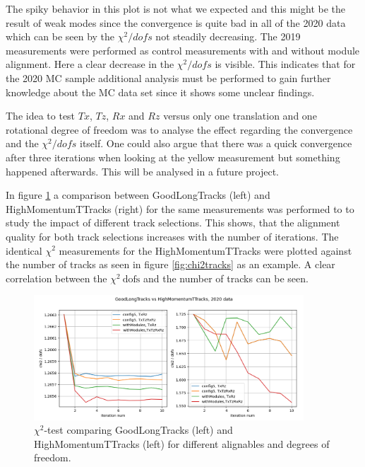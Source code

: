 The spiky behavior in this plot is not what we expected and this might be the result of weak modes since the convergence is quite bad in all of the 2020 data which can be seen by the $\chi^2 / dofs$ not steadily decreasing.
The 2019 measurements were performed as control measurements with and without
module alignment. Here a clear decrease in the $\chi^2 / dofs$ is visible. This
indicates that for the 2020 MC sample additional analysis must be performed to gain further knowledge about the MC data set since it shows some unclear findings.

The idea to test $Tx$, $Tz$, $Rx$ and $Rz$ versus only one translation and one
rotational degree of freedom was to analyse the effect regarding the convergence and the $\chi^2 / dofs$ itself. One could also argue that there was a quick convergence after three iterations when looking at the yellow measurement but something happened afterwards. This will be analysed in a future project.

In figure \ref{fig:chi2iter} a comparison between GoodLongTracks (left) and HighMomentumTTracks (right) for the same measurements was performed to to study the impact of different track selections. This shows, that the alignment quality for both track selections increases with the number of iterations.
The identical $\chi^2$ measurements for the HighMomentumTTracks were plotted against the number of tracks as seen in figure \ref{fig:chi2tracks} as an example.
A clear correlation between the $\chi^2 \ \text{dofs}$ and the number of tracks can be seen.

\begin{figure}
  \centering
  \includegraphics[width=0.9\textwidth]{plots/GL_HM_chi2_2020.png}
  \caption{$\chi^2$-test comparing GoodLongTracks (left) and HighMomentumTTracks (left) for different alignables and degrees of freedom.}
  \label{fig:chi2iter}
\end{figure}

